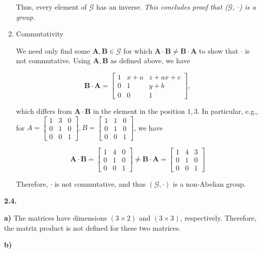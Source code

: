 \documentclass{article}
\def\ma{{\bm{A}}}
\def\mb{{\bm{B}}}
\begin{document}
\begin{enumerate}
    Thus, every element of $\mathcal{G}$ has an inverse. \textit{This concludes proof that ($\mathcal{G}$, $\cdot$) is a group.}
    
    \item Commutativity
    
    We need only find some $\ma, \mb \in \mathcal{G}$ for which $\ma \cdot \mb \neq \mb \cdot \ma$ to show that $\cdot$ is not commutative. Using $\ma, \mb$ as defined above, we have
    
    \[
    \mb \cdot \ma = \begin{bmatrix}
        1 & x + a & z + ax + c\\
        0 & 1 & y + b\\
        0 & 0 & 1
    \end{bmatrix},
    \]
    
    which differs from $\ma \cdot \mb$ in the element in the position $1, 3$. In particular, e.g., for $A = \begin{bmatrix}
        1 & 3 & 0\\
        0 & 1 & 0\\
        0 & 0 & 1
    \end{bmatrix}, B = \begin{bmatrix}
        1 & 1 & 0\\
        0 & 1 & 0\\
        0 & 0 & 1
    \end{bmatrix}$, we have
    
    \[
    \ma \cdot \mb = \begin{bmatrix}
        1 & 4 & 0\\
        0 & 1 & 0\\
        0 & 0 & 1
    \end{bmatrix} \neq \mb \cdot \ma = \begin{bmatrix}
        1 & 4 & 3\\
        0 & 1 & 0\\
        0 & 0 & 1
    \end{bmatrix}
    \]
    
    Therefore, $\cdot$ is not commutative, and thus $(\mathcal{G}, \cdot)$ is a non-Abelian group.
\end{enumerate}

\textbf{2.4.}

\textbf{a)} The matrices have dimensions $(3 \times 2)$ and $(3 \times 3)$, respectively. Therefore, the matrix product is not defined for these two matrices.

\textbf{b)}
\end{document}
